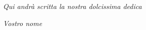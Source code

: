
\cleardoublepage
{}
\thispagestyle{empty}

\vspace*{3cm}

\begin{center}
	\emph{Qui andrà scritta la nostra dolcissima dedica}
\end{center}

\medskip

\noindent\textit{}
\hfill \emph{Vostro nome}

